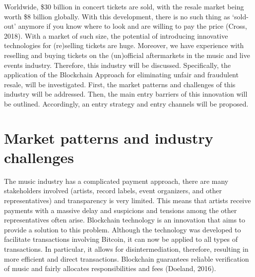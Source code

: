 \documentclass[a4paper,8pt,UTF8]{scrartcl}
\begin{document}
Worldwide, \$30 billion in concert tickets are sold, with the resale market being 
worth \$8 billion globally. With this development, there is no such thing as
 ‘sold-out’ anymore if you know where to look and are willing to pay the price 
 (Cross, 2018)\cite{globalnews2023}. With a market of such size, 
 the potential of introducing innovative technologies for (re)selling tickets are huge.
  Moreover, we have experience with reselling and buying tickets on the (un)official 
  aftermarkets in the music and live events industry. Therefore, this industry will 
  be discussed. Specifically, the application of the Blockchain Approach for 
  eliminating unfair and fraudulent resale, will be investigated. First, 
  the market patterns and challenges of this industry will be addressed. 
  Then, the main entry barriers of this innovation will be outlined. 
  Accordingly, an entry strategy and entry channels will be proposed.





\section{Market patterns and industry challenges}


The music industry has a complicated payment approach, there are many stakeholders  
involved (artists, record labels, event organizers, and other representatives) and 
transparency is very limited. This means that artists receive payments with a massive 
delay and suspicions and tensions among the other representatives often arise. 
Blockchain technology is an innovation that aims to provide a solution to this 
problem. Although the technology was developed to facilitate transactions involving Bitcoin, it can now be applied to all types of transactions. In particular, it allows for disintermediation, therefore, resulting in more efficient and direct transactions. Blockchain guarantees reliable verification of music and fairly allocates responsibilities and fees (Doeland, 2016)\cite{doeland2023}. 
\end{document}
